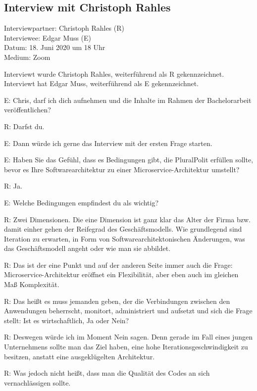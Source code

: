 \subsection{Interview mit Christoph Rahles}
\label{appendix:rahles}

Interviewpartner: Christoph Rahles (R) \\
Interviewee: Edgar Muss (E) \\
Datum: 18. Juni 2020 um 18 Uhr \\
Medium: Zoom

Interviewt wurde Christoph Rahles, weiterführend als R gekennzeichnet. Interviewt hat Edgar Muss, weiterführend als E gekennzeichnet.

E: Chris, darf ich dich aufnehmen und die Inhalte im Rahmen der Bachelorarbeit veröffentlichen?

R: Darfst du.

E: Dann würde ich gerne das Interview mit der ersten Frage starten.

E: Haben Sie das Gefühl, dass es Bedingungen gibt, die PluralPolit erfüllen sollte, bevor es Ihre Softwarearchitektur zu einer Microservice-Architektur umstellt?

R: Ja.

E: Welche Bedingungen empfindest du als wichtig?

\label{appendix:r-1}
R: Zwei Dimensionen. Die eine Dimension ist ganz klar das Alter der Firma bzw. damit einher gehen der Reifegrad des Geschäftsmodells. Wie grundlegend sind Iteration zu erwarten, in Form von Softwarearchitektonischen Änderungen, was das Geschäftsmodell angeht oder wie man sie abbildet.

\label{appendix:r-2}
R: Das ist der eine Punkt und auf der anderen Seite immer auch die Frage: Microservice-Architektur eröffnet ein Flexibilität, aber eben auch im gleichen Maß Komplexität.

\label{appendix:r-3}
R: Das heißt es muss  jemanden geben, der die Verbindungen zwischen den Anwendungen beherrscht, monitort, administriert und aufsetzt und sich die Frage stellt: Ist es wirtschaftlich, Ja oder Nein?

\label{appendix:r-4}
R: Deswegen würde ich im Moment Nein sagen. Denn gerade im Fall eines jungen Unternehmens sollte man das Ziel haben, eine hohe Iterationsgeschwindigkeit zu besitzen, anstatt eine ausgeklügelten Architektur.

\label{appendix:r-5}
R: Was jedoch nicht heißt, dass man die Qualität des Codes an sich vernachlässigen sollte.


